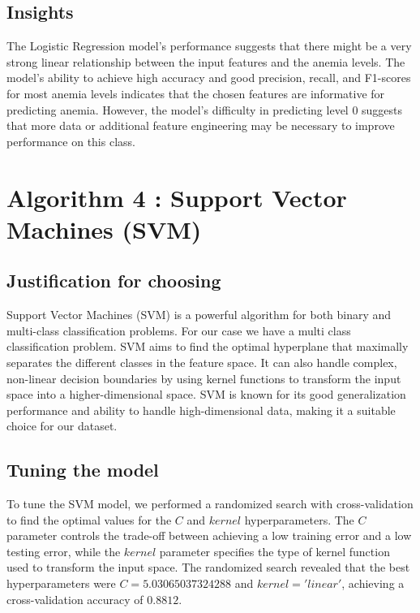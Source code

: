 \subsection{Insights}

The Logistic Regression model's performance suggests that there might be a very strong linear relationship between the input features and the anemia levels. The model's ability to achieve high accuracy and good precision, recall, and F1-scores for most anemia levels indicates that the chosen features are informative for predicting anemia. However, the model's difficulty in predicting level 0 suggests that more data or additional feature engineering may be necessary to improve performance on this class.

\section{Algorithm 4 : Support Vector Machines (SVM)}

\subsection{Justification for choosing}

Support Vector Machines (SVM) is a powerful algorithm for both binary and multi-class classification problems. For our case we have a multi class classification problem. SVM aims to find the optimal hyperplane that maximally separates the different classes in the feature space. It can also handle complex, non-linear decision boundaries by using kernel functions to transform the input space into a higher-dimensional space. SVM is known for its good generalization performance and ability to handle high-dimensional data, making it a suitable choice for our dataset.


\subsection{Tuning the model}

To tune the SVM model, we performed a randomized search with cross-validation to find the optimal values for the $C$ and $kernel$ hyperparameters. The $C$ parameter controls the trade-off between achieving a low training error and a low testing error, while the $kernel$ parameter specifies the type of kernel function used to transform the input space. The randomized search revealed that the best hyperparameters were $C=5.03065037324288$ and $kernel='linear'$, achieving a cross-validation accuracy of $0.8812$.

